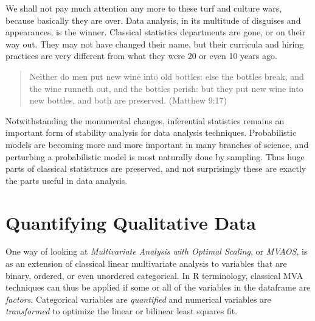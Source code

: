 \documentclass[
  12pt,
]{book}
\begin{document}
We shall not pay much attention any more to these turf and culture wars, because basically they are over. Data analysis, in its multitude of disguises and appearances, is the winner. Classical statistics departments are gone, or on their way out. They may not have changed their name, but their curricula and hiring practices are very different from what they were 20 or even 10 years ago.

\begin{quote}
Neither do men put new wine into old bottles: else the bottles break, and the wine runneth out, and the bottles
perish: but they put new wine into new bottles, and both are preserved. (Matthew 9:17)
\end{quote}

Notwithstanding the monumental changes, inferential statistics remains an important form of stability analysis for data analysis techniques. Probabilistic models are becoming more and more important in many branches of science, and perturbing a probabilistic model is most naturally done by sampling. Thus huge parts of classical statistrucs are preserved, and not surprisingly these are exactly the parts useful in data analysis.

\hypertarget{quantifying-qualitative-data}{%
\section{Quantifying Qualitative Data}\label{quantifying-qualitative-data}}

One way of looking at \emph{Multivariate Analysis with Optimal Scaling}, or \emph{MVAOS}, is as an extension of classical linear multivariate analysis to variables that are binary, ordered, or even unordered categorical. In R terminology, classical MVA techniques can thus be applied if some or all of the variables in the dataframe are \emph{factors}. Categorical variables are \emph{quantified} and numerical variables are \emph{transformed} to optimize the linear or bilinear least squares fit.
\end{document}
